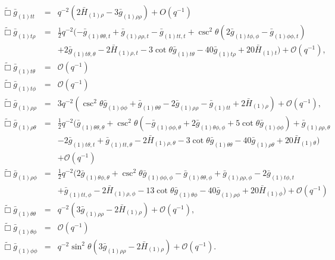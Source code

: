 \documentclass[a4paper,11pt]{article}
\numberwithin{equation}{section}
\begin{document}
\begin{eqnarray}\label{eqn:efett_3p1}
\tilde{\Box}\bar{g}_{(1)tt}&=&q^{-2} \left(2 \bar{H}_{(1) \rho }-3 \bar{g}_{(1) \rho \rho }\right)+O\left(q^{-1}\right)\\
%
\label{eqn:efetrho_3p1}
\tilde{\Box}\bar{g}_{(1)t\rho}&=&\frac{1}{2}q^{-2} (-\bar{g}_{(1)\theta \theta,t}+\bar{g}_{(1) \rho \rho ,t}-\bar{g}_{(1)
  \text{$tt$},t}+\csc ^2\theta \left(2 \bar{g}_{(1) \text{$t$$\phi $},\phi }-\bar{g}_{(1)
  \phi \phi ,t}\right) \nonumber\\
   &&+2 \bar{g}_{(1) \text{$t$$\theta $},\theta }-2 \bar{H}_{(1) \rho ,t}-3
   \cot \theta  \bar{g}_{(1) \text{$t$$\theta $}}-40 \bar{g}_{(1) \text{$t$$\rho $}}+20
   \bar{H}_{(1) t}) +\mathcal{O}(q^{-1}),\\
%
\label{eqn:efettheta_3p1}
\tilde{\Box}\bar{g}_{(1)t\theta}&=&\mathcal{O}(q^{-1})\\
%
\label{eqn:efetphi_3p1}
\tilde{\Box}\bar{g}_{(1)t\phi}&=&\mathcal{O}(q^{-1})\\
%
\label{eqn:eferhorho_3p1}
\tilde{\Box}\bar{g}_{(1)\rho\rho}&=&3q^{-2} \left(\csc ^2\theta \bar{g}_{(1) \phi \phi }+\bar{g}_{(1)\theta \theta}-2 \bar{g}_{(1)
   \rho \rho }-\bar{g}_{(1) \text{$tt$}}+2 \bar{H}_{(1) \rho }\right)+\mathcal{O}(q^{-1}),\\
% 
\label{eqn:eferhotheta_3p1}
\tilde{\Box}\bar{g}_{(1)\rho\theta}&=&\frac{1}{2} q^{-2}(\bar{g}_{(1)\theta \theta,\theta }+\csc ^2\theta \left(-\bar{g}_{(1)
   \phi \phi ,\theta }+2 \bar{g}_{(1)\theta \phi,\phi }+5 \cot \theta  \bar{g}_{(1) \phi
   \phi }\right)+\bar{g}_{(1) \rho \rho ,\theta }\nonumber\\
   &&-2 \bar{g}_{(1) \text{$t$$\theta
   $},t}+\bar{g}_{(1) \text{$tt$},\theta }-2 \bar{H}_{(1) \rho ,\theta }-3 \cot \theta 
   \bar{g}_{(1)\theta \theta}-40 \bar{g}_{(1) \rho \theta }+20 \bar{H}_{(1)\theta})\nonumber\\
   &&+\mathcal{O}(q^{-1})\\
% 
\label{eqn:eferhophi_3p1}
\tilde{\Box}\bar{g}_{(1)\rho\phi}&=&\frac{1}{2} q^{-2}(2 \bar{g}_{(1)\theta \phi,\theta }+\csc ^2\theta \bar{g}_{(1) \phi
   \phi ,\phi }-\bar{g}_{(1)\theta \theta,\phi }+\bar{g}_{(1) \rho \rho ,\phi }-2
   \bar{g}_{(1) \text{$t$$\phi $},t}\nonumber\\
   &&+\bar{g}_{(1) \text{$tt$},\phi }-2 \bar{H}_{(1) \rho ,\phi }-13
   \cot \theta  \bar{g}_{(1)\theta \phi}-40 \bar{g}_{(1) \rho \phi }+20 \bar{H}_{(1) \phi
   })+\mathcal{O}(q^{-1})\\
%
\label{eqn:efethetatheta_3p1}
\tilde{\Box}\bar{g}_{(1)\theta\theta}&=&q^{-2}  \left(3 \bar{g}_{(1) \rho \rho }-2 \bar{H}_{(1) \rho }\right)+\mathcal{O}(q^{-1}),\\
%
\label{eqn:efethetaphi_3p1}
\tilde{\Box}\bar{g}_{(1)\theta\phi}&=&\mathcal{O}(q^{-1})\\
%
\label{eqn:efephiphi_3p1}
\tilde{\Box}\bar{g}_{(1)\phi\phi}&=&q^{-2}  \sin^2\theta\left(3 \bar{g}_{(1) \rho \rho }-2 \bar{H}_{(1) \rho }\right)+\mathcal{O}(q^{-1}).
\end{eqnarray}
\end{document}
